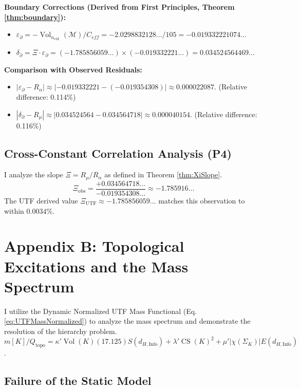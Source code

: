\documentclass[11pt, a4paper]{article}
\theoremstyle{definition}
\theoremstyle{definition}
\newcommand{\M}{\mathcal{M}}
\newcommand{\Qtopo}{Q_{\text{topo}}}
\newcommand{\CS}{\operatorname{CS}}
\newcommand{\Vol}{\operatorname{Vol}}
\newcommand{\V}[1]{\Vol(#1)}
\newcommand{\VolNcrit}{\Vol_{\ncrit}}
\newcommand{\dHInfo}{d_{H,\mathrm{Info}}} %
\newcommand{\ncrit}{n_{\mathrm{crit}}}
\begin{document}
\textbf{Boundary Corrections (Derived from First Principles, Theorem \ref{thm:boundary}):}
\begin{itemize}
\item $\varepsilon_\partial = -\VolNcrit(\M)/C_{eff} = -2.0298832128.../105 = -0.019332221074...$
\item $\delta_\partial = \Xi \cdot \varepsilon_\partial = (-1.785856059...) \times (-0.019332221...) = 0.034524564469...$
\end{itemize}

\textbf{Comparison with Observed Residuals:}
\begin{itemize}
    \item $|\varepsilon_\partial - R_\alpha| \approx |-0.019332221 - (-0.019354308)| \approx 0.000022087$. (Relative difference: 0.114\%)
    \item $|\delta_\partial - R_\mu| \approx |0.034524564 - 0.034564718| \approx 0.000040154$. (Relative difference: 0.116\%)
\end{itemize}


\subsection{Cross-Constant Correlation Analysis (P4)}

I analyze the slope $\Xi = R_\mu / R_\alpha$ as defined in Theorem \ref{thm:XiSlope}.
\begin{equation}
    \Xi_{\text{obs}} = \frac{+0.034564718...}{-0.019354308...} \approx -1.785916...
\end{equation}
The UTF derived value $\Xi_{\text{UTF}} \approx -1.785856059...$ matches this observation to within $0.0034\%$.

\section{Appendix B: Topological Excitations and the Mass Spectrum}

I utilize the Dynamic Normalized UTF Mass Functional (Eq. \eqref{eq:UTFMassNormalized}) to analyze the mass spectrum and demonstrate the resolution of the hierarchy problem.
$m[K]/\Qtopo = \kappa' \V{K} (17.125) S(\dHInfo) + \lambda' \CS(K)^2 + \mu' |\chi(\Sigma_K)| E(\dHInfo)$.

\subsection{Failure of the Static Model}
\label{app:StaticFailure}
\end{document}
